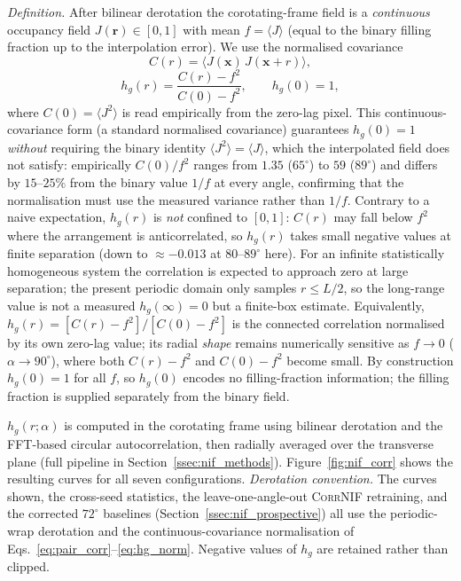 \documentclass[aip,amsmath,amssymb,reprint]{revtex4-1}
\newcommand{\dang}{\ensuremath{\alpha}}
\begin{document}
\textit{Definition.}
After bilinear derotation the corotating-frame field is a \emph{continuous}
occupancy field $J(\mathbf{r}) \in [0,1]$ with mean
$f = \langle J \rangle$ (equal to the binary filling fraction up to the
interpolation error).  We use the normalised covariance
\begin{equation}
  C(r) = \langle J(\mathbf{x})\,J(\mathbf{x}+r)\rangle,
  \label{eq:pair_corr}
\end{equation}
\begin{equation}
  h_g(r) = \frac{C(r) - f^2}{C(0) - f^2},
  \qquad h_g(0) = 1,
  \label{eq:hg_norm}
\end{equation}
where $C(0)=\langle J^2\rangle$ is read empirically from the zero-lag
pixel.  This continuous-covariance form (a standard normalised covariance)
guarantees $h_g(0)=1$ \emph{without} requiring the binary identity
$\langle J^2\rangle=\langle J\rangle$, which the interpolated field does not
satisfy: empirically $C(0)/f^2$ ranges from $1.35$ ($65^{\circ}$) to $59$
($89^{\circ}$) and differs by $15$--$25\%$ from the binary value $1/f$ at
every angle, confirming that the normalisation must use the measured
variance rather than $1/f$.
Contrary to a naive expectation, $h_g(r)$ is \emph{not} confined to
$[0,1]$: $C(r)$ may fall below $f^2$ where the arrangement is anticorrelated,
so $h_g(r)$ takes small negative values at finite separation (down to
$\approx-0.013$ at $80$--$89^{\circ}$ here).
For an infinite statistically homogeneous system the correlation is
expected to approach zero at large separation; the present periodic domain
only samples $r\le L/2$, so the long-range value is not a measured
$h_g(\infty)=0$ but a finite-box estimate.
Equivalently, $h_g(r)=[C(r)-f^2]/[C(0)-f^2]$ is the connected correlation
normalised by its own zero-lag value; its radial \emph{shape} remains
numerically sensitive as $f\to 0$ ($\dang\to 90^{\circ}$), where both
$C(r)-f^2$ and $C(0)-f^2$ become small.  By construction $h_g(0)=1$ for all
$f$, so $h_g(0)$ encodes no filling-fraction information; the filling
fraction is supplied separately from the binary field.

$h_g(r;\dang)$ is computed in the corotating frame using bilinear
derotation and the FFT-based circular autocorrelation, then
radially averaged over the transverse plane
(full pipeline in Section~\ref{ssec:nif_methods}).
Figure~\ref{fig:nif_corr} shows the resulting curves for all
seven configurations.
\emph{Derotation convention.}  The curves shown, the cross-seed statistics,
the leave-one-angle-out \textsc{CorrNIF} retraining, and the corrected
$72^{\circ}$ baselines (Section~\ref{ssec:nif_prospective}) all use the
periodic-wrap derotation and the continuous-covariance normalisation of
Eqs.~\ref{eq:pair_corr}--\ref{eq:hg_norm}.  Negative values of $h_g$ are
retained rather than clipped.
\end{document}
